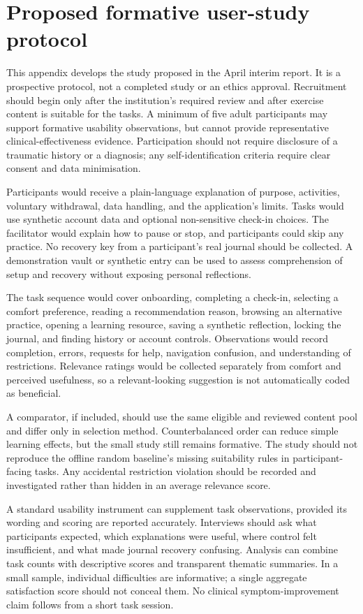 \section{Proposed formative user-study protocol}

This appendix develops the study proposed in the April interim report. It is a prospective protocol, not a completed study or an ethics approval. Recruitment should begin only after the institution's required review and after exercise content is suitable for the tasks. A minimum of five adult participants may support formative usability observations, but cannot provide representative clinical-effectiveness evidence. Participation should not require disclosure of a traumatic history or a diagnosis; any self-identification criteria require clear consent and data minimisation.

Participants would receive a plain-language explanation of purpose, activities, voluntary withdrawal, data handling, and the application's limits. Tasks would use synthetic account data and optional non-sensitive check-in choices. The facilitator would explain how to pause or stop, and participants could skip any practice. No recovery key from a participant's real journal should be collected. A demonstration vault or synthetic entry can be used to assess comprehension of setup and recovery without exposing personal reflections.

The task sequence would cover onboarding, completing a check-in, selecting a comfort preference, reading a recommendation reason, browsing an alternative practice, opening a learning resource, saving a synthetic reflection, locking the journal, and finding history or account controls. Observations would record completion, errors, requests for help, navigation confusion, and understanding of restrictions. Relevance ratings would be collected separately from comfort and perceived usefulness, so a relevant-looking suggestion is not automatically coded as beneficial.

A comparator, if included, should use the same eligible and reviewed content pool and differ only in selection method. Counterbalanced order can reduce simple learning effects, but the small study still remains formative. The study should not reproduce the offline random baseline's missing suitability rules in participant-facing tasks. Any accidental restriction violation should be recorded and investigated rather than hidden in an average relevance score.

A standard usability instrument can supplement task observations, provided its wording and scoring are reported accurately. Interviews should ask what participants expected, which explanations were useful, where control felt insufficient, and what made journal recovery confusing. Analysis can combine task counts with descriptive scores and transparent thematic summaries. In a small sample, individual difficulties are informative; a single aggregate satisfaction score should not conceal them. No clinical symptom-improvement claim follows from a short task session.

